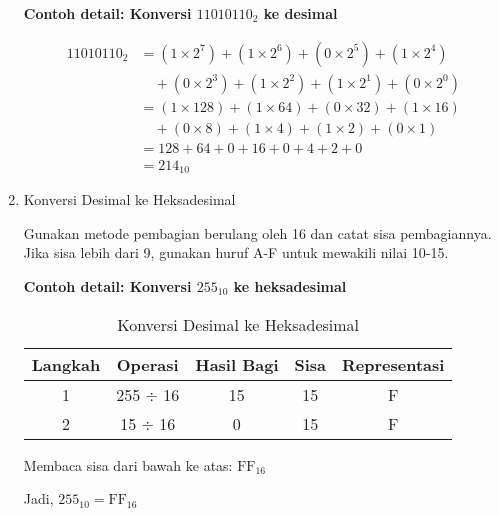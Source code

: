 \documentclass[../main.tex]{subfiles}
\begin{document}
\begin{enumerate}
                    \textbf{Contoh detail: Konversi \(11010110_2\) ke desimal}

                    \begin{align*}
                    11010110_2 &= (1 \times 2^7) + (1 \times 2^6) + (0 \times 2^5) + (1 \times 2^4) \\
                    &\quad + (0 \times 2^3) + (1 \times 2^2) + (1 \times 2^1) + (0 \times 2^0) \\
                    &= (1 \times 128) + (1 \times 64) + (0 \times 32) + (1 \times 16) \\
                    &\quad + (0 \times 8) + (1 \times 4) + (1 \times 2) + (0 \times 1) \\
                    &= 128 + 64 + 0 + 16 + 0 + 4 + 2 + 0 \\
                    &= 214_{10}
                    \end{align*}

                \item{Konversi Desimal ke Heksadesimal}

                    Gunakan metode pembagian berulang oleh 16 dan catat sisa pembagiannya. Jika sisa lebih dari 9, gunakan huruf A-F untuk mewakili nilai 10-15.

                    \textbf{Contoh detail: Konversi \(255_{10}\) ke heksadesimal}

                    \begin{table}[H]
                        \centering
                        \caption{Konversi Desimal ke Heksadesimal}
                        \begin{tabular}{|c|c|c|c|c|}
                            \hline
                            \textbf{Langkah} & \textbf{Operasi} & \textbf{Hasil Bagi} & \textbf{Sisa} & \textbf{Representasi} \\
                            \hline
                            1 & 255 $\div$ 16 & 15 & 15 & F \\
                            2 & 15 $\div$ 16 & 0 & 15 & F \\
                            \hline
                        \end{tabular}
                        \label{tab:decimal-to-hex}
                    \end{table}

                    Membaca sisa dari bawah ke atas: \(\mathrm{FF}_{16}\)

                    Jadi, \(255_{10} = \mathrm{FF}_{16}\)


\end{enumerate}
\end{document}
